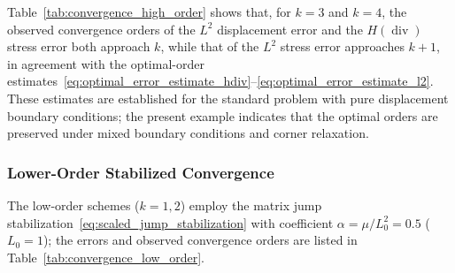 Table~\ref{tab:convergence_high_order} shows that, for $k=3$ and $k=4$, the observed convergence orders of the $L^2$ displacement error and the $H(\operatorname{div})$ stress error both approach $k$, while that of the $L^2$ stress error approaches $k+1$, in agreement with the optimal-order estimates~\eqref{eq:optimal_error_estimate_hdiv}--\eqref{eq:optimal_error_estimate_l2}. These estimates are established for the standard problem with pure displacement boundary conditions; the present example indicates that the optimal orders are preserved under mixed boundary conditions and corner relaxation.

\subsubsection{Lower-Order Stabilized Convergence}

The low-order schemes ($k=1,2$) employ the matrix jump stabilization~\eqref{eq:scaled_jump_stabilization} with coefficient $\alpha=\mu/L_0^2=0.5$ ($L_0=1$); the errors and observed convergence orders are listed in Table~\ref{tab:convergence_low_order}.


